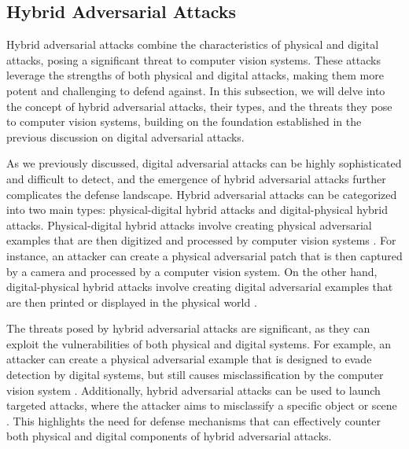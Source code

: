 \documentclass[11pt]{article}
\begin{document}
\subsection{Hybrid Adversarial Attacks}

Hybrid adversarial attacks combine the characteristics of physical and digital attacks, posing a significant threat to computer vision systems. These attacks leverage the strengths of both physical and digital attacks, making them more potent and challenging to defend against. In this subsection, we will delve into the concept of hybrid adversarial attacks, their types, and the threats they pose to computer vision systems, building on the foundation established in the previous discussion on digital adversarial attacks.

As we previously discussed, digital adversarial attacks can be highly sophisticated and difficult to detect, and the emergence of hybrid adversarial attacks further complicates the defense landscape. Hybrid adversarial attacks can be categorized into two main types: physical-digital hybrid attacks and digital-physical hybrid attacks. Physical-digital hybrid attacks involve creating physical adversarial examples that are then digitized and processed by computer vision systems \cite{ref63}. For instance, an attacker can create a physical adversarial patch that is then captured by a camera and processed by a computer vision system. On the other hand, digital-physical hybrid attacks involve creating digital adversarial examples that are then printed or displayed in the physical world \cite{ref32}.

The threats posed by hybrid adversarial attacks are significant, as they can exploit the vulnerabilities of both physical and digital systems. For example, an attacker can create a physical adversarial example that is designed to evade detection by digital systems, but still causes misclassification by the computer vision system \cite{ref73}. Additionally, hybrid adversarial attacks can be used to launch targeted attacks, where the attacker aims to misclassify a specific object or scene \cite{ref65}. This highlights the need for defense mechanisms that can effectively counter both physical and digital components of hybrid adversarial attacks.
\end{document}
